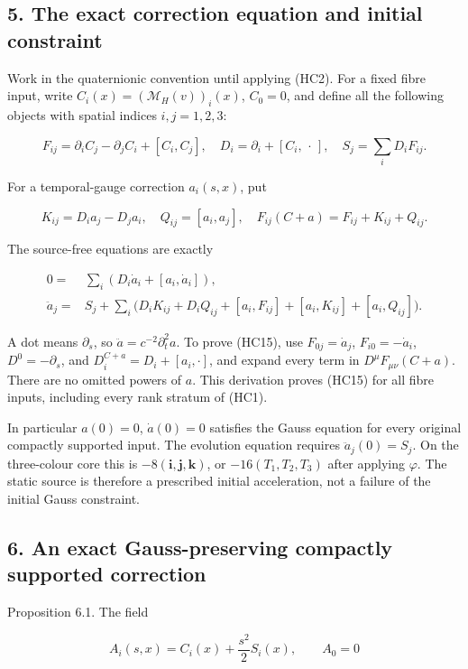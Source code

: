 \documentclass[11pt]{article}
\begin{document}
\subsection*{5. The exact correction equation and initial constraint}

Work in the quaternionic convention until applying (HC2). For a fixed
fibre input, write \(C_i(x)=(\mathcal M_H(v))_i(x)\), \(C_0=0\), and
define all the following objects with spatial indices \(i,j=1,2,3\):

\[
 F_{ij}=\partial_iC_j-\partial_jC_i+[C_i,C_j],\quad
 D_i=\partial_i+[C_i,\,\cdot\,],\quad
 S_j=\sum_iD_iF_{ij}.
 \tag{HC14}
\]

For a temporal-gauge correction \(a_i(s,x)\), put

\[
 K_{ij}=D_i a_j-D_j a_i,\quad Q_{ij}=[a_i,a_j],\quad
 F_{ij}(C+a)=F_{ij}+K_{ij}+Q_{ij}.
\]

The source-free equations are exactly

\[
 \begin{aligned}
 0={}&\sum_i\left(D_i\dot a_i+[a_i,\dot a_i]\right),\\
 \ddot a_j={}&S_j+\sum_i\bigl(
 D_iK_{ij}+D_iQ_{ij}+[a_i,F_{ij}]
                  +[a_i,K_{ij}]+[a_i,Q_{ij}]\bigr).
 \end{aligned}\tag{HC15}
\]

A dot means \(\partial_s\), so \(\ddot a=c^{-2}\partial_t^2a\).
To prove (HC15), use \(F_{0j}=\dot a_j\), \(F_{i0}=-\dot a_i\),
\(D^0=-\partial_s\), and \(D_i^{C+a}=D_i+[a_i,\cdot]\), and expand
every term in \(D^\mu F_{\mu\nu}(C+a)\). There are no omitted powers of
\(a\). This derivation proves (HC15) for all fibre inputs, including every
rank stratum of (HC1).

In particular \(a(0)=0\), \(\dot a(0)=0\) satisfies the Gauss equation
for every original compactly supported input. The evolution equation
requires \(\ddot a_j(0)=S_j\). On the three-colour core this is
\(-8(\mathbf i,\mathbf j,\mathbf k)\), or
\(-16(T_1,T_2,T_3)\) after applying \(\varphi\). The static source is
therefore a prescribed initial acceleration, not a failure of the
initial Gauss constraint.

\subsection*{6. An exact Gauss-preserving compactly supported correction}

Proposition 6.1. The field

\[
 A_i(s,x)=C_i(x)+\frac{s^2}{2}S_i(x),\qquad A_0=0
 \tag{HC16}
\]
\end{document}
